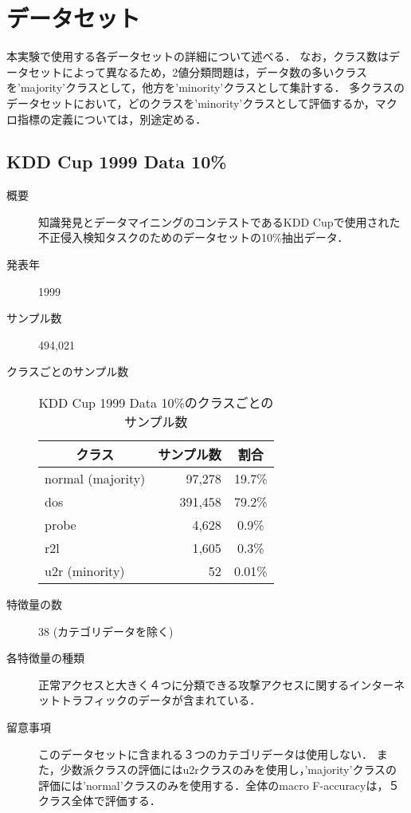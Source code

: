 \section{データセット}
\label{sec:dataset}
本実験で使用する各データセットの詳細について述べる．
なお，クラス数はデータセットによって異なるため，2値分類問題は，データ数の多いクラスを'majority'クラスとして，他方を'minority'クラスとして集計する．
多クラスのデータセットにおいて，どのクラスを'minority'クラスとして評価するか，マクロ指標の定義については，別途定める．

\subsection{KDD Cup 1999 Data 10\%}
\begin{description}
    \item[概要] 知識発見とデータマイニングのコンテストであるKDD Cupで使用された不正侵入検知タスクのためのデータセットの10\%抽出データ．
    \item[発表年] 1999
    \item[サンプル数] 494,021
    \item[クラスごとのサンプル数] \mbox{}
        \begin{table}
            \centering
            \caption{KDD Cup 1999 Data 10\%のクラスごとのサンプル数}
                \label{tab:kddcup1999data10percent}
                \begin{tabular}{lrc} \hline
                    \multicolumn{1}{c}{クラス}&
                    \multicolumn{1}{c}{サンプル数}&
                    \multicolumn{1}{c}{割合}\\
                    \hline
                    \hline
                    normal  (majority)& 97,278 & 19.7\% \\
                    dos & 391,458 & 79.2\% \\
                    probe & 4,628 & 0.9\% \\
                    r2l & 1,605 & 0.3\% \\
                    u2r (minority)& 52 & 0.01\% \\ 
                    \hline
                \end{tabular}
        \end{table}
    \item[特徴量の数] 38 (カテゴリデータを除く)
    \item[各特徴量の種類] 正常アクセスと大きく４つに分類できる攻撃アクセスに関するインターネットトラフィックのデータが含まれている．
    \item[留意事項] このデータセットに含まれる３つのカテゴリデータは使用しない．
                   また，少数派クラスの評価にはu2rクラスのみを使用し，'majority'クラスの評価には'normal'クラスのみを使用する．全体のmacro F-accuracyは，５クラス全体で評価する．
\end{description}

